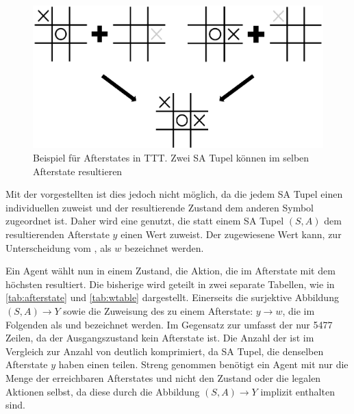 \begin{figure}
    \centering
    \includegraphics[scale=0.4]{04_Artefakte/01_Abbildungen/ttt_boards/ttt_afterstate.pdf}
    \caption[Beispiel für Afterstates in \acs{TTT}]{Beispiel für Afterstates in \acs{TTT}. Zwei \ac{SA Tupel} können im selben Afterstate resultieren \protect\footnotemark}
    \label{fig:ttt_afterstate}
\end{figure}

Mit der vorgestellten \qtable ist dies jedoch nicht möglich, da die \qFunction jedem \ac{SA Tupel} einen individuellen \qValue zuweist und der resultierende Zustand dem anderen Symbol zugeordnet ist. 
Daher wird eine \afterStateVFunction genutzt, die statt einem \ac{SA Tupel} $(S,A)$ dem resultierenden Afterstate $y$ einen Wert zuweist. 
Der zugewiesene Wert kann, zur Unterscheidung vom \qValue, als \wValue $w$ bezeichnet werden.\cite{nbroReinforcementLearningHow}

Ein Agent wählt nun in einem Zustand, die Aktion, die im Afterstate mit dem höchsten \wValue resultiert. 
Die bisherige \qtable wird geteilt in zwei separate Tabellen, wie in  \cref{tab:afterstate} und \cref{tab:wtable} dargestellt. 
Einerseits die surjektive Abbildung $(S,A) \rightarrow Y$ sowie die Zuweisung des \wValue zu einem Afterstate: $y \rightarrow w$, die im Folgenden als \afterstateTable und \wtable bezeichnet werden. 
Im Gegensatz zur \qtable umfasst der \wtable nur 5477 Zeilen, da der Ausgangszustand kein Afterstate ist. 
Die Anzahl der \wValues ist im Vergleich zur Anzahl von \qValues deutlich komprimiert, da \ac{SA Tupel}, die denselben Afterstate $y$ haben einen \wValue teilen.
Streng genommen benötigt ein Agent mit \afterStateVFunction nur die Menge der erreichbaren Afterstates und nicht den Zustand oder die legalen Aktionen selbst, da diese durch die Abbildung $(S,A) \rightarrow Y$ implizit enthalten sind. \cite{nbroReinforcementLearningHow}



